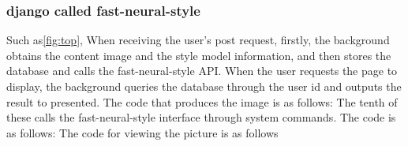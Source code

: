 \subsubsection{django called fast-neural-style}
Such as\ref{fig:top}, When receiving the user's post request, firstly, the background obtains the content image and the style model information, and then stores the database and calls the fast-neural-style API. When the user requests the page to display, the background queries the database through the user id and outputs the result to presented.
The code that produces the image is as follows:
The tenth of these calls the fast-neural-style interface through system commands. The code is as follows:
The code for viewing the picture is as follows
